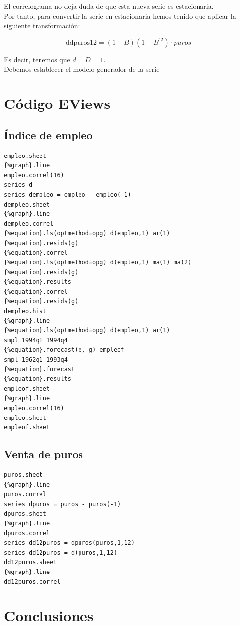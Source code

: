 \documentclass[12pt,a4paper,twoside,openright,titlepage,final]{article}
\begin{document}
El correlograma no deja duda de que esta nueva serie es estacionaria.\\

Por tanto, para convertir la serie en estacionaria hemos tenido que aplicar la siguiente transformación:

\[ \text{ddpuros12} = (1-B)(1-B^{12}) \cdot puros \]

Es decir, tenemos que $d=D=1$.\\

Debemos establecer el modelo generador de la serie.

\clearpage
\section{Código EViews}

\subsection{Índice de empleo}

\begin{verbatim}
empleo.sheet
{%graph}.line
empleo.correl(16)
series d
series dempleo = empleo - empleo(-1)
dempleo.sheet
{%graph}.line
dempleo.correl
{%equation}.ls(optmethod=opg) d(empleo,1) ar(1)
{%equation}.resids(g)
{%equation}.correl
{%equation}.ls(optmethod=opg) d(empleo,1) ma(1) ma(2)
{%equation}.resids(g)
{%equation}.results
{%equation}.correl
{%equation}.resids(g)
dempleo.hist
{%graph}.line
{%equation}.ls(optmethod=opg) d(empleo,1) ar(1)
smpl 1994q1 1994q4
{%equation}.forecast(e, g) empleof
smpl 1962q1 1993q4
{%equation}.forecast 
{%equation}.results
empleof.sheet
{%graph}.line
empleo.correl(16)
empleo.sheet
empleof.sheet
\end{verbatim}

\subsection{Venta de puros}


\begin{verbatim}
puros.sheet
{%graph}.line
puros.correl
series dpuros = puros - puros(-1)
dpuros.sheet
{%graph}.line
dpuros.correl
series dd12puros = dpuros(puros,1,12)
series dd12puros = d(puros,1,12)
dd12puros.sheet
{%graph}.line
dd12puros.correl
\end{verbatim}


\section{Conclusiones}
\end{document}
